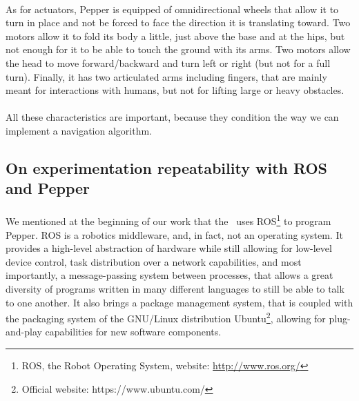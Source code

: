 \paragraph{} As for actuators, Pepper is equipped of omnidirectional wheels that allow it to turn in place and not be forced to face the direction it is translating toward. Two motors allow it to fold its body a little, just above the base and at the hips, but not enough for it to be able to touch the ground with its arms. Two motors allow the head to move forward/backward and turn left or right (but not for a full turn). Finally, it has two articulated arms including fingers, that are mainly meant for interactions with humans, but not for lifting large or heavy obstacles.

\paragraph{} All these characteristics are important, because they condition the way we can implement a navigation algorithm.

\subsection{On experimentation repeatability with ROS and Pepper}

\paragraph{} We mentioned at the beginning of our work that the \groupname \, uses ROS\footnote{ROS, the Robot Operating System, website: \url{http://www.ros.org/}} to program Pepper. ROS is a robotics middleware, and, in fact, not an operating system. It provides a high-level abstraction of hardware while still allowing for low-level device control, task distribution over a network capabilities, and most importantly, a message-passing system between processes, that allows a great diversity of programs written in many different languages to still be able to talk to one another. It also brings a package management system, that is coupled with the packaging system of the GNU/Linux distribution Ubuntu\footnote{Official website: https://www.ubuntu.com/}, allowing for plug-and-play capabilities for new software components.

